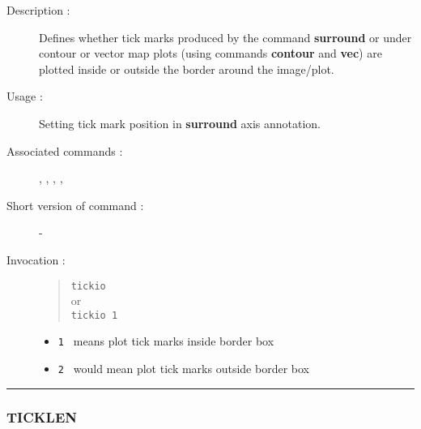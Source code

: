 \begin{description}

\item[Description :] Defines whether tick marks produced by the command
{\bf surround} or under contour or vector map plots (using commands
{\bf contour} and {\bf vec}) are plotted inside or outside the border
around the image/plot.

\item[Usage :] Setting tick mark position in {\bf surround} axis annotation.

\item[Associated commands :] {\tt {}},
{\tt {}}, {\tt {}},
{\tt {}}, {\tt {}}

\item[Short version of command :] -
\item[Invocation :]

\begin{quote}{\tt  tickio }\\
or \\
{\tt tickio 1 }
\end{quote}

\begin{itemize}

\item {\tt 1 } means plot tick marks inside border box
\item {\tt 2 } would mean plot tick marks outside border box
\end{itemize}

\end{description}

\hrule
\subsubsection*{\label{TICKLEN}TICKLEN}

